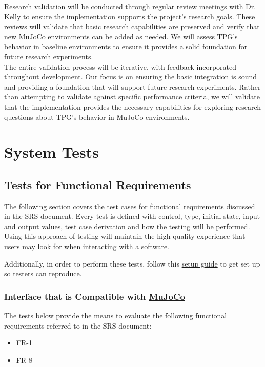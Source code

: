\documentclass[12pt, titlepage]{article}
\begin{document}
Research validation will be conducted through regular review meetings with Dr. Kelly to ensure the implementation supports the project's research goals. These reviews will validate that basic research capabilities are preserved and verify that new MuJoCo environments can be added as needed. We will assess TPG's behavior in baseline environments to ensure it provides a solid foundation for future research experiments. \\

The entire validation process will be iterative, with feedback incorporated throughout development. Our focus is on ensuring the basic integration is sound and providing a foundation that will support future research experiments. Rather than attempting to validate against specific performance criteria, we will validate that the implementation provides the necessary capabilities for exploring research questions about TPG's behavior in MuJoCo environments.

\section{System Tests}


\subsection{Tests for Functional Requirements}

The following section covers the test cases for functional requirements discussed in the SRS document. Every test is defined with control, type, initial state, input and output values, test case derivation and how the testing will be performed. Using this approach of testing will maintain the high-quality experience that users may look for when interacting with a software.

Additionally, in order to perform these tests, follow this \href{https://gitlab.cas.mcmaster.ca/kellys32/tpg/-/wikis/Dev-Container-Setup-Guide}{setup guide} to get set up so testers can reproduce.

\subsubsection{Interface that is Compatible with \href{https://mujoco.org/}{MuJoCo}}

The tests below provide the means to evaluate the following functional requirements referred to in the SRS document:
\begin{itemize}
  \item FR-1
  \item FR-8
\end{itemize}
\end{document}

